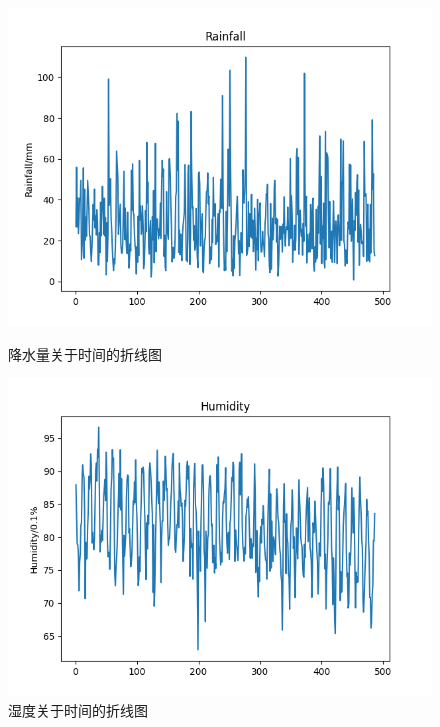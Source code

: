 \documentclass[UTF8, a4paper]{ctexart}
\begin{document}
\begin{figure}[h!]
	\centering
	\begin{minipage}[h!]{0.4\textwidth}
		\centering
		\includegraphics[scale=0.3]{rr.png}
		\caption{降水量关于时间的折线图}
	\end{minipage}
	\begin{minipage}[h!]{0.4\textwidth}
		\centering
		\includegraphics[scale=0.3]{hu.png}
		\caption{湿度关于时间的折线图}
	\end{minipage}
\end{figure}
\end{document}

